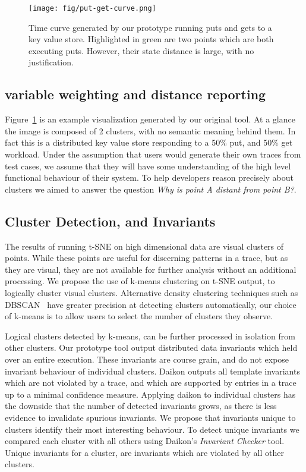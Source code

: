 \begin{figure}[t]
\centering
    \texttt{[image: fig/put-get-curve.png]}

    \caption{
        Time curve generated by our prototype running puts and gets to
        a key value store. Highlighted in green are two points which
        are both executing puts. However, their state distance is
        large, with no justification.
    }

    \label{fig:desparate-points}
\end{figure}

\subsection{variable weighting and distance reporting}
Figure~\ref{fig:desparate-points} is an example
visualization generated by our original tool. At a glance the image is
composed of 2 clusters, with no semantic meaning behind them.
In fact this is a distributed key value store responding to a 50\%
put, and 50\% get workload. Under the assumption that users would
generate their own traces from test cases, we assume that they will
have some understanding of the high level functional behaviour of
their system. To help developers reason precisely about clusters we
aimed to answer the question \emph{Why is point A distant from point
B?}.

\subsection{Cluster Detection, and Invariants}
The results of running t-SNE on high dimensional data are visual
clusters of points. While these points are useful for discerning
patterns in a trace, but as they are visual, they are not available
for further analysis without an additional processing. We propose the
use of k-means clustering on t-SNE output, to logically cluster visual
clusters. Alternative density clustering techniques such as
DBSCAN~\cite{Ester96adensity-based} have greater precision at detecting
clusters automatically, our choice of k-means is to allow users to
select the number of clusters they observe.

Logical clusters detected by k-means, can be further processed in
isolation from other clusters. Our prototype tool output distributed
data invariants which held over an entire execution. These invariants
are course grain, and do not expose invariant behaviour of individual
clusters.  
%
Daikon outputs all template invariants which are not violated by a
trace, and which are supported by entries in a trace up to a minimal
confidence measure. Applying daikon to individual clusters has the
downside that the number of detected invariants grows, as there is
less evidence to invalidate spurious invariants. We propose that
invariants unique to clusters identify their most interesting
behaviour. To detect unique invariants we compared each cluster with
all others using Daikon's \emph{Invariant Checker} tool. Unique
invariants for a cluster, are invariants which are violated by all
other clusters.



